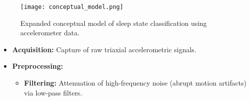\documentclass[conference]{IEEEtran}
\begin{document}
\begin{figure}[h]
    \centering
    \texttt{[image: conceptual\_model.png]}
    \caption{Expanded conceptual model of sleep state classification using accelerometer data.}
    \label{fig:conceptual_model}
\end{figure}

\begin{itemize}
	\item \textbf{Acquisition:}
	      Capture of raw triaxial accelerometric signals.
	\item \textbf{Preprocessing:}
            \begin{itemize}
		      \item \textbf{Filtering:} Attenuation of high-frequency noise (abrupt motion artifacts) via low-pass filters.
              

\end{itemize}
\end{itemize}
\end{document}
